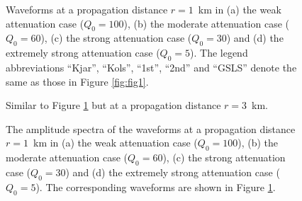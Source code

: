 \documentclass[article]{./macros/elsarticle_qh}
\begin{document}
\begin{figure}[H]
\centering
{}
\caption{
Waveforms at a propagation distance $r=1$~km in (a) the weak attenuation case ($Q_{0} = 100$), (b) the moderate attenuation case ($Q_{0} = 60$), (c) the strong attenuation case ($Q_{0} = 30$) and (d) the extremely strong attenuation case ($Q_{0} = 5$). The legend abbreviations ``Kjar'', ``Kols'', ``1st'', ``2nd'' and ``GSLS'' denote the same as those in Figure \ref{fig:fig1}. 
}
\label{fig:fig6}
\end{figure}

\begin{figure}[H]
\centering
{}
\caption{
Similar to Figure \ref{fig:fig6} but at a propagation distance $r=3$~km. 
}
\label{fig:fig7}
\end{figure}

\begin{figure}[H]
\centering
{}
\caption{
The amplitude spectra of the waveforms at a propagation distance $r=1$~km in (a) the weak attenuation case ($Q_{0} = 100$), (b) the moderate attenuation case ($Q_{0} = 60$), (c) the strong attenuation case ($Q_{0} = 30$) and (d) the extremely strong attenuation case ($Q_{0} = 5$). The corresponding waveforms are shown in Figure \ref{fig:fig6}.  
}
\label{fig:fig8}
\end{figure}
\end{document}
